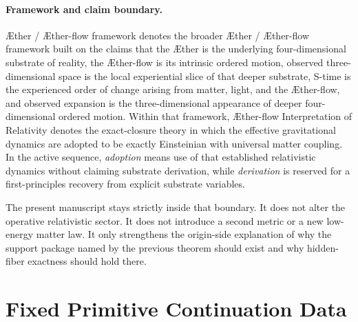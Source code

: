 \documentclass[11pt]{article}
\newcommand{\Aether}{\AE{}ther}
\newcommand{\Aflow}{\AE{}ther-flow}
\newcommand{\TheoryName}{\Aflow{} Interpretation of Relativity}
\newcommand{\TheoryProgram}{\Aether{} / \Aflow{} framework}
\begin{document}
\paragraph{Framework and claim boundary.}
\TheoryProgram{} denotes the broader \Aether{} / \Aflow{} framework built on the claims that the \Aether{} is the underlying four-dimensional substrate of reality, the \Aflow{} is its intrinsic ordered motion, observed three-dimensional space is the local experiential slice of that deeper substrate, S-time is the experienced order of change arising from matter, light, and the \Aflow{}, and observed expansion is the three-dimensional appearance of deeper four-dimensional ordered motion. Within that framework, \TheoryName{} denotes the exact-closure theory in which the effective gravitational dynamics are adopted to be exactly Einsteinian with universal matter coupling. In the active sequence, \emph{adoption} means use of that established relativistic dynamics without claiming substrate derivation, while \emph{derivation} is reserved for a first-principles recovery from explicit substrate variables.

The present manuscript stays strictly inside that boundary. It does not alter the operative relativistic sector. It does not introduce a second metric or a new low-energy matter law. It only strengthens the origin-side explanation of why the support package named by the previous theorem should exist and why hidden-fiber exactness should hold there.

\section{Fixed Primitive Continuation Data}
\end{document}
